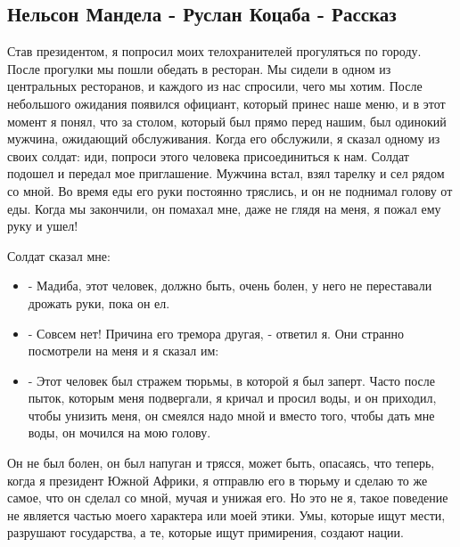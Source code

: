  
 
 

\subsection{Нельсон Мандела - Руслан Коцаба - Рассказ}


Став президентом, я попросил моих телохранителей прогуляться по городу. После
прогулки мы пошли обедать в ресторан. Мы сидели в одном из центральных
ресторанов, и каждого из нас спросили, чего мы хотим. После небольшого ожидания
появился официант, который принес наше меню, и в этот момент я понял, что за
столом, который был прямо перед нашим, был одинокий мужчина, ожидающий
обслуживания. Когда его обслужили, я сказал одному из своих солдат: иди,
попроси этого человека присоединиться к нам. Солдат подошел и передал мое
приглашение. Мужчина встал, взял тарелку и сел рядом со мной. Во время еды его
руки постоянно тряслись, и он не поднимал голову от еды. Когда мы закончили, он
помахал мне, даже не глядя на меня, я пожал ему руку и ушел!

Солдат сказал мне:

\begin{itemize}
\item - Мадиба, этот человек, должно быть, очень болен, у него не переставали дрожать руки, пока он ел.
\item - Совсем нет! Причина его тремора другая, - ответил я. Они странно
				посмотрели на меня и я сказал им:
\item - Этот человек был стражем тюрьмы, в которой я был заперт. Часто после
				пыток, которым меня подвергали, я кричал и просил воды, и он приходил,
				чтобы унизить меня, он смеялся надо мной и вместо того, чтобы дать мне
				воды, он мочился на мою голову.
\end{itemize}

Он не был болен, он был напуган и трясся, может быть, опасаясь, что теперь,
когда я президент Южной Африки, я отправлю его в тюрьму и сделаю то же самое,
что он сделал со мной, мучая и унижая его. Но это не я, такое поведение не
является частью моего характера или моей этики. Умы, которые ищут мести,
разрушают государства, а те, которые ищут примирения, создают нации.

